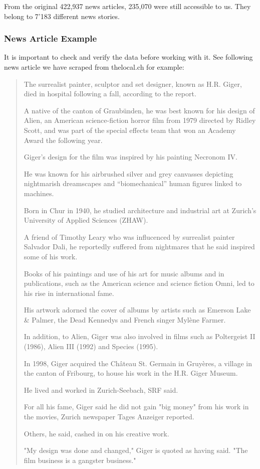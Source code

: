 From the original 422,937 news articles, 235,070 were still accessible to us.
They belong to 7'183 different news stories.

\subsubsection{News Article Example}
\label{subsubsec:4a_news_article_example}
It is important to check and verify the data before working with it.
See following news article we have scraped from thelocal.ch\cite{HRGiger} for example:

\begin{quote}
    The surrealist painter, sculptor and set designer, known as H.R. Giger,
    died in hospital following a fall, according to the report.

    A native of the canton of Graubünden, he was best known for his design of Alien,
    an American science-fiction horror film from 1979 directed by Ridley Scott,
    and was part of the special effects team that won an Academy Award the following year.

    Giger’s design for the film was inspired by his painting Necronom IV.

    He was known for his airbrushed silver and grey canvasses
    depicting nightmarish dreamscapes and “biomechanical” human figures linked to machines.

    Born in Chur in 1940, he studied architecture and industrial art at
    Zurich’s University of Applied Sciences (ZHAW).

    A friend of Timothy Leary who was influcenced by surrealist painter Salvador Dali,
    he reportedly suffered from nightmares that he said inspired some of his work.

    Books of his paintings and use of his art for music albums and in publications,
    such as the American science and science fiction Omni, led to his rise in international fame.

    His artwork adorned the cover of albums by artists such as Emerson Lake \& Palmer,
    the Dead Kennedys and French singer Mylène Farmer.

    In addition, to Alien, Giger was also involved in films such as Poltergeist II (1986),
    Alien III (1992) and Species (1995).

    In 1998, Giger acquired the Château St. Germain in Gruyères,
    a village in the canton of Fribourg, to house his work in the H.R. Giger Museum.

    He lived and worked in Zurich-Seebach, SRF said.

    For all his fame, Giger said he did not gain "big money" from his work in the movies,
    Zurich newspaper Tages Anzeiger reported.

    Others, he said, cashed in on his creative work.

    "My design was done and changed," Giger is quoted as having said.
    "The film business is a gangster business."
\end{quote}

